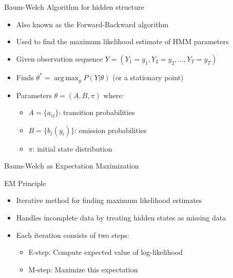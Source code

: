 \documentclass{beamer}
\DeclareMathOperator*{\argmax}{arg\,max}
\begin{document}
\begin{frame}{Baum-Welch Algorithm for hidden structure}
    \begin{itemize}
        \item Also known as the Forward-Backward algorithm
        \item Used to find the maximum likelihood estimate of HMM parameters
        \item Given observation sequence $Y = (Y_1=y_1, Y_2=y_2, ..., Y_T=y_T)$
        \item Finds $\theta^* = \argmax_{\theta} P(Y|\theta)$ (or a stationary point)
        \item Parameters $\theta = (A, B, \pi)$ where:
        \begin{itemize}
            \item $A = \{a_{ij}\}$: transition probabilities
            \item $B = \{b_j(y_i)\}$: emission probabilities
            \item $\pi$: initial state distribution
        \end{itemize}
    \end{itemize}
\end{frame}
\begin{frame}{Baum-Welch as Expectation Maximization}
    \begin{block}{EM Principle}
        \begin{itemize}
            \item Iterative method for finding maximum likelihood estimates
            \item Handles incomplete data by treating hidden states as missing data
            \item Each iteration consists of two steps:
            \begin{itemize}
                \item E-step: Compute expected value of log-likelihood
                \item M-step: Maximize this expectation
            \end{itemize}
        \end{itemize}
    \end{block}
\end{frame}
\end{document}
